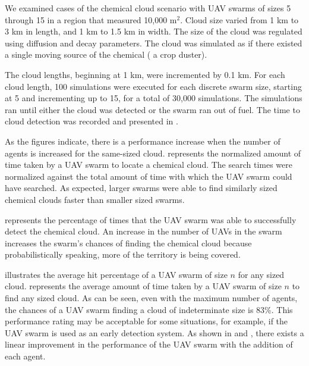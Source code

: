 We examined cases of the chemical cloud scenario with UAV swarms of sizes 5 through 15 in a region that measured 10,000 m$^{2}$. Cloud size varied from 1 km to 3 km in length, and 1 km to 1.5 km in width. The size of the cloud was regulated using diffusion and decay parameters. The cloud was simulated as if there existed a single moving source of the chemical (\eg{} a crop duster).

The cloud lengths, beginning at 1 km, were incremented by 0.1 km. For each cloud length, 100 simulations were executed for each discrete swarm size, starting at 5 and incrementing up to 15, for a total of 30,000 simulations. The simulations ran until either the cloud was detected or the swarm ran out of fuel. The time to cloud detection was recorded and presented in .

As the figures indicate, there is a performance increase when the number of agents is increased for the same-sized cloud.  represents the normalized amount of time taken by a UAV swarm to locate a chemical cloud. The search times were normalized against the total amount of time with which the UAV swarm could have searched. As expected, larger swarms were able to find similarly sized chemical clouds faster than smaller sized swarms.

 represents the percentage of times that the UAV swarm was able to successfully detect the chemical cloud. An increase in the number of UAVs in the swarm increases the swarm's chances of finding the chemical cloud because probabilistically speaking, more of the territory is being covered. 

 illustrates the average hit percentage of a UAV swarm of size $n$ for any sized cloud.  represents the average amount of time taken by a UAV swarm of size $n$ to find any sized cloud. As can be seen, even with the maximum number of agents, the chances of a UAV swarm finding a cloud of indeterminate size is 83{\%}. This performance rating may be acceptable for some situations, for example, if the UAV swarm is used as an early detection system. As shown in  and , there exists a linear improvement in the performance of the UAV swarm with the addition of each agent. 

\clearpage


